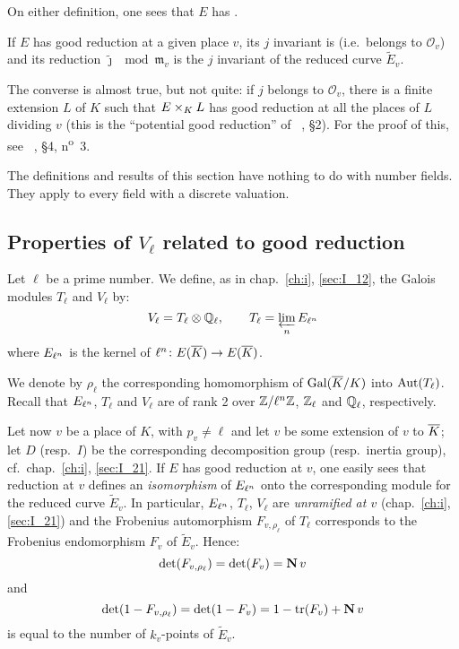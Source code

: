 On either definition, one sees that $E$ has .

If $E$ has good reduction at a given place $v$, its $j$ invariant is
 (i.e.\ belongs to $\mathcal{O}_v$) and its reduction
$\tilde\jmath \mod{\mathfrak{m}_v}$ is the $j$ invariant of the reduced curve
$\widetilde{E}_v$.

The converse is almost true, but not quite: if $j$ belongs to $\mathcal{O}_v$,
there is a finite extension $L$ of $K$ such that $E \times_K L$ has good
reduction at all the places of $L$ dividing $v$ (this is the ``potential good
reduction'' of \citeauthor{32}~\cite{32}, \S 2). For the proof of this, see
\citeauthor{29}~\cite{29}, \S 4, n\textsuperscript{o}~3.

\begin{obs}
The definitions and results of this section have nothing to do with number
fields. They apply to every field with a discrete valuation.
\end{obs}

\subsection{Properties of \texorpdfstring{$V_\ell$}{Vℓ} related to good
reduction}\label{sec:IV_13}
Let $\ell$ be a prime number. We define, as in chap.~\ref{ch:i},
\ref{sec:I_12}, the Galois modules $T_\ell$ and $V_\ell$ by:
\[
	V_\ell = T_\ell \otimes \mathbb{Q}_\ell, \qquad T_\ell = \varprojlim_n
	{E}_{\ell^n}
\]
where ${E}_{\ell^n}$ is the kernel of $\ell^n \colon E(\overline{K}) \to
E(\overline{K})$.
\dpage

We denote by $\rho_\ell$ the corresponding homomorphism of $\operatorname{Gal}(\overline{K}/K)$
into $\operatorname{Aut}(T_\ell)$. Recall that ${E}_{\ell^n}$, $T_\ell$ and $V_\ell$ are
of rank 2 over $\mathbb{Z}/\ell^n\mathbb{Z}$, $\mathbb{Z}_\ell$ and $\mathbb{Q}_\ell$, respectively.

Let now $v$ be a place of $K$, with $p_v \ne \ell$ and let $v$ be some
extension of $v$ to $\overline{K}$; let $D$ (resp.\ $I$) be the corresponding
decomposition group (resp.\ inertia group), cf.\ chap.~\ref{ch:i},
\ref{sec:I_21}. If $E$ has good reduction at $v$, one easily sees that
reduction at $v$ defines an \emph{isomorphism} of ${E}_{\ell^n}$ onto the
corresponding module for the reduced curve $\widetilde{E}_v$. In particular,
${E}_{\ell^n}$, $T_\ell$, $V_\ell$ are \emph{unramified at $v$}
(chap.~\ref{ch:i}, \ref{sec:I_21}) and the Frobenius automorphism $F_{v,
\rho_\ell}$ of $T_\ell$ corresponds to the Frobenius endomorphism $F_v$ of
$\widetilde{E}_v$. Hence: 
\[
	\det(F_{v, \rho_\ell}) = \det(F_v) = \operatorname{\mathbf{N}} v
\]
and
\[
	\det(1 - F_{v, \rho_\ell}) = \det(1 - F_v) = 1 - \operatorname{tr}(F_v)
	+ \operatorname{\mathbf{N}} v
\]
is equal to the number of $k_v$-points of $\widetilde{E}_v$.

